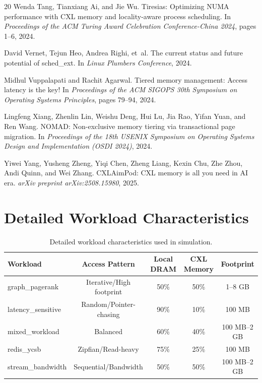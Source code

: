 \documentclass[11pt]{article}
\begin{document}
\begin{thebibliography}{20}
Wenda Tang, Tianxiang Ai, and Jie Wu.
\newblock Tiresias: Optimizing NUMA performance with CXL memory and locality-aware process scheduling.
\newblock In \emph{Proceedings of the ACM Turing Award Celebration Conference-China 2024}, pages 1--6, 2024.

David Vernet, Tejun Heo, Andrea Righi, et~al.
\newblock The current status and future potential of sched\_ext.
\newblock In \emph{Linux Plumbers Conference}, 2024.

Midhul Vuppalapati and Rachit Agarwal.
\newblock Tiered memory management: Access latency is the key!
\newblock In \emph{Proceedings of the ACM SIGOPS 30th Symposium on Operating Systems Principles}, pages 79--94, 2024.

Lingfeng Xiang, Zhenlin Lin, Weishu Deng, Hui Lu, Jia Rao, Yifan Yuan, and Ren Wang.
\newblock NOMAD: Non-exclusive memory tiering via transactional page migration.
\newblock In \emph{Proceedings of the 18th USENIX Symposium on Operating Systems Design and Implementation (OSDI 2024)}, 2024.

Yiwei Yang, Yusheng Zheng, Yiqi Chen, Zheng Liang, Kexin Chu, Zhe Zhou, Andi Quinn, and Wei Zhang.
\newblock CXLAimPod: CXL memory is all you need in AI era.
\newblock \emph{arXiv preprint arXiv:2508.15980}, 2025.

\end{thebibliography}

\newpage
\appendix

\section{Detailed Workload Characteristics}

\begin{table}[h]
\caption{Detailed workload characteristics used in simulation.}
\label{tab:workloads}
\centering
\small
\begin{tabular}{lcccc}
\toprule
Workload & Access Pattern & Local DRAM & CXL Memory & Footprint \\
\midrule
graph\_pagerank & Iterative/High footprint & 50\% & 50\% & 1--8 GB \\
latency\_sensitive & Random/Pointer-chasing & 90\% & 10\% & 100 MB \\
mixed\_workload & Balanced & 60\% & 40\% & 100 MB--2 GB \\
redis\_ycsb & Zipfian/Read-heavy & 75\% & 25\% & 100 MB \\
stream\_bandwidth & Sequential/Bandwidth & 50\% & 50\% & 100 MB--2 GB \\
\bottomrule
\end{tabular}
\end{table}
\end{document}
